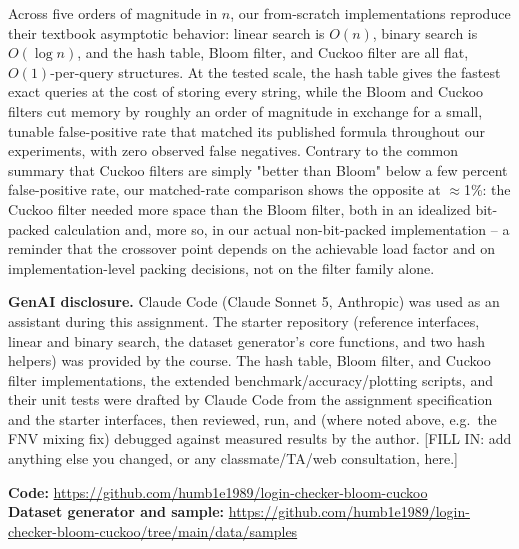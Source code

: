 \documentclass[acmsmall,screen,nonacm=true]{acmart}
\begin{document}
Across five orders of magnitude in $n$, our from-scratch implementations
reproduce their textbook asymptotic behavior: linear search is $O(n)$,
binary search is $O(\log n)$, and the hash table, Bloom filter, and Cuckoo
filter are all flat, $O(1)$-per-query structures. At the tested scale, the
hash table gives the fastest exact queries at the cost of storing every
string, while the Bloom and Cuckoo filters cut memory by roughly an order
of magnitude in exchange for a small, tunable false-positive rate that
matched its published formula throughout our experiments, with zero
observed false negatives. Contrary to the common summary that Cuckoo
filters are simply "better than Bloom" below a few percent
false-positive rate, our matched-rate comparison shows the opposite at
$\approx$1\%: the Cuckoo filter needed more space than the Bloom filter,
both in an idealized bit-packed calculation and, more so, in our actual
non-bit-packed implementation -- a reminder that the crossover point
depends on the achievable load factor and on implementation-level packing
decisions, not on the filter family alone.

\begin{acks}
\textbf{GenAI disclosure.} Claude Code (Claude Sonnet 5, Anthropic) was
used as an assistant during this assignment. The starter repository
(reference interfaces, linear and binary search, the dataset
generator's core functions, and two hash helpers) was provided by the
course. The hash table, Bloom filter, and Cuckoo filter
implementations, the extended benchmark/accuracy/plotting scripts, and
their unit tests were drafted by Claude Code from the assignment
specification and the starter interfaces, then reviewed, run, and
(where noted above, e.g.\ the FNV mixing fix) debugged against
measured results by the author. [FILL IN: add anything else you
changed, or any classmate/TA/web consultation, here.]

\textbf{Code:} \url{https://github.com/humb1e1989/login-checker-bloom-cuckoo} \\
\textbf{Dataset generator and sample:} \url{https://github.com/humb1e1989/login-checker-bloom-cuckoo/tree/main/data/samples}
\end{acks}



\end{document}

